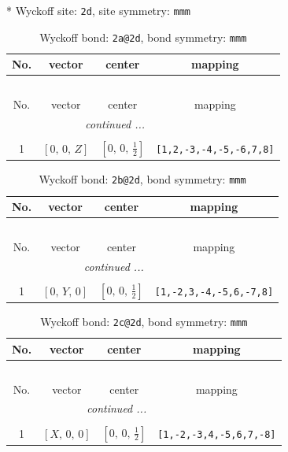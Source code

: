 \documentclass[fleqn,8pt]{jsarticle}
\begin{document}
* Wyckoff site: {\tt 2d}, site symmetry: {\tt mmm}
\renewcommand{\arraystretch}{1.2}
\begin{longtable}{cccc}
\caption{Wyckoff bond: {\tt 2a@2d}, bond symmetry: {\tt mmm}}
 \\
 \hline \hline
No. & vector & center & mapping \\ \hline \endfirsthead

\multicolumn{3}{l}{\tablename\ \thetable{}} \\
 \hline \hline
No. & vector & center & mapping \\ \hline \endhead

 \hline \hline
\multicolumn{3}{r}{\footnotesize\it continued ...} \\ \endfoot

 \hline \hline
\multicolumn{3}{r}{} \\ \endlastfoot

1 & $\left[ 0,\, 0,\, Z \right]$ & $\left[ 0,\, 0,\, \frac{1}{2} \right]$ & {\tt [1,2,-3,-4,-5,-6,7,8]} \\
\end{longtable}
\renewcommand{\arraystretch}{1.2}
\begin{longtable}{cccc}
\caption{Wyckoff bond: {\tt 2b@2d}, bond symmetry: {\tt mmm}}
 \\
 \hline \hline
No. & vector & center & mapping \\ \hline \endfirsthead

\multicolumn{3}{l}{\tablename\ \thetable{}} \\
 \hline \hline
No. & vector & center & mapping \\ \hline \endhead

 \hline \hline
\multicolumn{3}{r}{\footnotesize\it continued ...} \\ \endfoot

 \hline \hline
\multicolumn{3}{r}{} \\ \endlastfoot

1 & $\left[ 0,\, Y,\, 0 \right]$ & $\left[ 0,\, 0,\, \frac{1}{2} \right]$ & {\tt [1,-2,3,-4,-5,6,-7,8]} \\
\end{longtable}
\renewcommand{\arraystretch}{1.2}
\begin{longtable}{cccc}
\caption{Wyckoff bond: {\tt 2c@2d}, bond symmetry: {\tt mmm}}
 \\
 \hline \hline
No. & vector & center & mapping \\ \hline \endfirsthead

\multicolumn{3}{l}{\tablename\ \thetable{}} \\
 \hline \hline
No. & vector & center & mapping \\ \hline \endhead

 \hline \hline
\multicolumn{3}{r}{\footnotesize\it continued ...} \\ \endfoot

 \hline \hline
\multicolumn{3}{r}{} \\ \endlastfoot

1 & $\left[ X,\, 0,\, 0 \right]$ & $\left[ 0,\, 0,\, \frac{1}{2} \right]$ & {\tt [1,-2,-3,4,-5,6,7,-8]} \\
\end{longtable}
\end{document}
